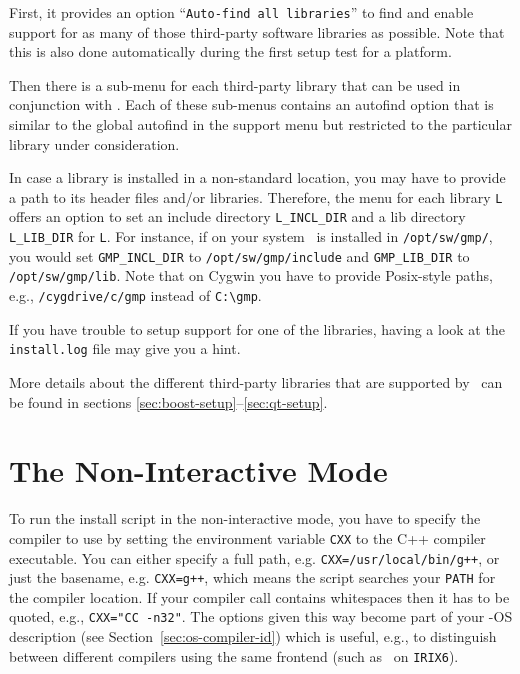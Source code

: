First, it provides an option ``\texttt{Auto-find all libraries}'' to
find and enable support for as many of those third-party software
libraries as possible. Note that this is also done automatically
during the first setup test for a platform.

Then there is a sub-menu for each third-party library that can be used
in conjunction with \cgal. Each of these sub-menus contains an
autofind option that is similar to the global autofind in the support
menu but restricted to the particular library under consideration.

In case a library is installed in a non-standard location, you may
have to provide a path to its header files and/or libraries.
Therefore, the menu for each library \texttt{L} offers an option to
set an include directory \texttt{L\_INCL\_DIR} and a lib directory
\texttt{L\_LIB\_DIR} for \texttt{L}. For instance, if on your system
\gmp\ is installed in \texttt{/opt/sw/gmp/}, you would set
\texttt{GMP\_INCL\_DIR} to \texttt{/opt/sw/gmp/include} and
\texttt{GMP\_LIB\_DIR} to \texttt{/opt/sw/gmp/lib}. Note that on
Cygwin you have to provide Posix-style paths, e.g.,
\texttt{/cygdrive/c/gmp} instead of \verb|C:\gmp|.

If you have trouble to setup support for one of the libraries, having
a look at the \texttt{install.log} file may give you a hint.

More details about the different third-party libraries that are
supported by \cgal\ can be found in sections
\ref{sec:boost-setup}--\ref{sec:qt-setup}.

\section{The Non-Interactive Mode\label{sec:non-interactive}}

To run the install script in the non-interactive mode, you have to
specify the compiler to use by setting the environment variable
\texttt{CXX} to the C++ compiler executable.
You can either specify a full path, e.g.
\texttt{CXX=/usr/local/bin/g++}, or just the basename, e.g.
\texttt{CXX=g++}, which means the script searches your \texttt{PATH}
for the compiler location. If your compiler call contains whitespaces
then it has to be quoted, e.g., \texttt{CXX="CC -n32"}. The options
given this way become part of your \cgal-OS description (see Section~\ref{sec:os-compiler-id}) which is useful,
e.g., to distinguish between different compilers using the same
frontend (such as \mipsprocc\ on \texttt{IRIX6}).

